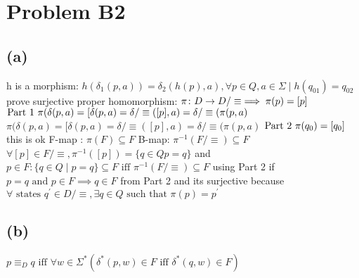 \documentclass[12pt]{article}
\begin{document}
\section*{Problem B2}
\subsection*{(a)}
h is a morphism:
$h(\delta_1(p,a)) = \delta_2(h(p),a), \forall p \in Q, a \in \Sigma \mid h(q_01) = q_02$ \newline
prove surjective proper homomorphism:
$\pi\colon D\rightarrow D/\equiv \implies \pi(p) = [p]$ \newline
$\text{Part 1 }\newline \pi(\delta(p, a) = [\delta(p,a) = \delta/\equiv([p], a)
= \delta / \equiv({\pi}(p,a)$ \newline
$\pi(\delta(p, a) = [\delta(p,a) = \delta/\equiv([p], a)
= \delta / \equiv({\pi}(p,a)$ \newline
$\text{Part 2 }\newline \pi(q_0) = [q_0]$ this is ok\newline
F-map : ${\pi}(F) \subseteq F$ \newline
B-map: ${\pi}^{-1}(F/\equiv) \subseteq F$ \newline
$\forall [p] \in F/\equiv, {\pi}^{-1}([p]) =\{ q \in Q p = q\}$ \newline
and $p \in F : \{q \in Q \mid p = q\} \subseteq F \text{ iff }
{\pi}^{-1}(F/\equiv) \subseteq F$ using Part 2 \newline
if $p=q \text{ and } p\in F \implies q \in F$ from Part 2 \newline
and its surjective because $\forall \text{ states } q^{'} \in D/\equiv,
\exists q \in Q \text{ such that } {\pi}(p) = p^{'}$ \newline

\subsection*{(b)}
$p \equiv_D q \text{ iff } \forall w \in \Sigma^{*}
(\delta^{*}(p,w) \in F \text{ iff } \delta^{*}(q,w) \in F)$
\end{document}
